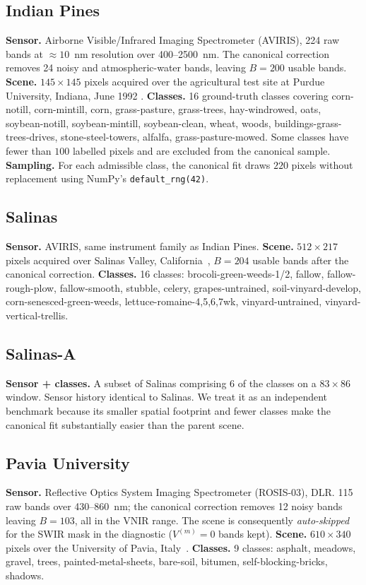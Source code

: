 \documentclass[11pt,a4paper]{article}
\begin{document}
\subsection{Indian Pines}
\textbf{Sensor.} Airborne Visible/Infrared Imaging Spectrometer
(AVIRIS), 224 raw bands at $\approx 10$~nm resolution over
400--2500~nm. The canonical correction removes 24 noisy and
atmospheric-water bands, leaving $B = 200$ usable bands.
\textbf{Scene.} $145 \times 145$ pixels acquired over the
agricultural test site at Purdue University, Indiana, June 1992
\cite{baumgardner1992indianpines}. \textbf{Classes.} 16 ground-truth
classes covering corn-notill, corn-mintill, corn, grass-pasture,
grass-trees, hay-windrowed, oats, soybean-notill, soybean-mintill,
soybean-clean, wheat, woods, buildings-grass-trees-drives,
stone-steel-towers, alfalfa, grass-pasture-mowed. Some classes have
fewer than $100$ labelled pixels and are excluded from the canonical
sample.
\textbf{Sampling.} For each admissible class, the canonical fit draws
$220$ pixels without replacement using NumPy's
\texttt{default\_rng(42)}.

\subsection{Salinas}
\textbf{Sensor.} AVIRIS, same instrument family as Indian Pines.
\textbf{Scene.} $512 \times 217$ pixels acquired over Salinas Valley,
California~\cite{aviris_salinas}, $B = 204$ usable bands after the
canonical correction.
\textbf{Classes.} 16 classes: brocoli-green-weeds-1/2, fallow,
fallow-rough-plow, fallow-smooth, stubble, celery, grapes-untrained,
soil-vinyard-develop, corn-senesced-green-weeds,
lettuce-romaine-{4,5,6,7}wk, vinyard-untrained, vinyard-vertical-trellis.

\subsection{Salinas-A}
\textbf{Sensor + classes.} A subset of Salinas comprising 6 of the
classes on a $83 \times 86$ window. Sensor history identical to
Salinas. We treat it as an independent benchmark because its smaller
spatial footprint and fewer classes make the canonical fit
substantially easier than the parent scene.

\subsection{Pavia University}
\textbf{Sensor.} Reflective Optics System Imaging Spectrometer
(ROSIS-03), DLR. 115 raw bands over 430--860~nm; the canonical
correction removes 12 noisy bands leaving $B = 103$, all in the VNIR
range. The scene is consequently \emph{auto-skipped} for the SWIR
mask in the diagnostic ($V^{(m)} = 0$ bands kept).
\textbf{Scene.} $610 \times 340$ pixels over the University of Pavia,
Italy~\cite{rosis_pavia}.
\textbf{Classes.} 9 classes: asphalt, meadows, gravel, trees,
painted-metal-sheets, bare-soil, bitumen, self-blocking-bricks,
shadows.
\end{document}
